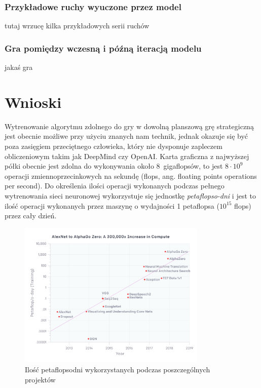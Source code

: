 \documentclass[licencjacka]{pracamgr}
\begin{document}
\subsection{Przykładowe ruchy wyuczone przez model}

tutaj wrzucę kilka przykładowych serii ruchów


\subsection{Gra pomiędzy wczesną i późną iteracją modelu}

jakaś gra

\chapter{Wnioski}

Wytrenowanie algorytmu zdolnego do gry w dowolną planszową grę strategiczną jest obecnie możliwe przy użyciu znanych nam technik, jednak okazuje się być poza zasięgiem przeciętnego człowieka, który nie dysponuje zapleczem obliczeniowym takim jak DeepMind czy OpenAI. Karta graficzna z najwyższej półki obecnie jest zdolna do wykonywania około 8~gigaflopsów, to jest $8 \cdot 10^9$ operacji zmiennoprzecinkowych na sekundę (flops, ang. floating points operations per second). Do określenia ilości operacji wykonanych podczas pełnego wytrenowania sieci neuronowej wykorzystuje się jednostkę \emph{petaflopso-dni} i jest to ilość operacji wykonanych przez maszynę o wydajności 1 petaflopsa ($10^{15}$ flops) przez cały dzień. 

\begin{figure}[ht]
  \centering
  \includegraphics[width=0.8\textwidth]{compute}
  \caption{Ilość petaflopsodni wykorzystanych podczas poszczególnych projektów \cite{dqn, resnet, dota2, nmt, alphago2016, alphagozero}}
\end{figure}
\end{document}
